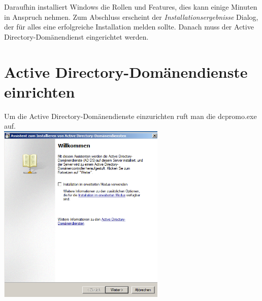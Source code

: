 \documentclass[12pt,a4paper,titlepage]{article} %
\begin{document}
Daraufhin installiert Windows die Rollen und Features, dies kann einige Minuten in Anspruch nehmen. Zum Abschluss erscheint der \emph{Installationsergebnisse} Dialog, der für alles eine erfolgreiche Installation melden sollte. Danach muss der Active Directory-Domänendienst eingerichtet werden.
 
 \newpage
 \section{Active Directory-Domänendienste einrichten}
Um die Active Directory-Domänendienste einzurichten ruft man die dcpromo.exe auf.\\

	\includegraphics[width=8cm]{Bilder/014(dcpromo_exe01)}\\
\end{document}
